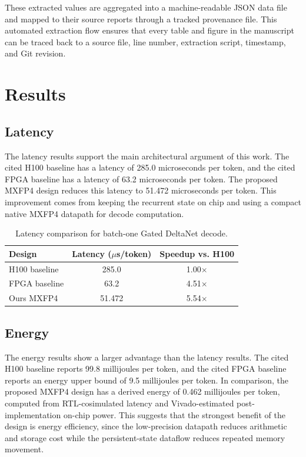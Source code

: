 \documentclass[conference]{IEEEtran}
\begin{document}
These extracted values are aggregated into a machine-readable JSON data file and mapped to their source reports through a tracked provenance file. This automated extraction flow ensures that every table and figure in the manuscript can be traced back to a source file, line number, extraction script, timestamp, and Git revision.

\section{Results}

\subsection{Latency}
The latency results support the main architectural argument of this work. The cited H100 baseline has a latency of 285.0 microseconds per token, and the cited FPGA baseline has a latency of 63.2 microseconds per token. The proposed MXFP4 design reduces this latency to 51.472 microseconds per token. This improvement comes from keeping the recurrent state on chip and using a compact native MXFP4 datapath for decode computation.


\begin{table}[t]
\centering
\caption{Latency comparison for batch-one Gated DeltaNet decode.}
\label{tab:latency_results}
\scriptsize
\setlength{\tabcolsep}{4pt}
\renewcommand{\arraystretch}{0.92}
\begin{tabular}{lcc}
\hline
Design & Latency ($\mu$s/token) & Speedup vs. H100 \\
\hline
H100 baseline & 285.0 & 1.00$\times$ \\
FPGA baseline & 63.2 & 4.51$\times$ \\
Ours MXFP4 & 51.472 & 5.54$\times$ \\
\hline
\end{tabular}
\end{table}

\subsection{Energy}
The energy results show a larger advantage than the latency results. The cited H100 baseline reports 99.8 millijoules per token, and the cited FPGA baseline reports an energy upper bound of 9.5 millijoules per token. In comparison, the proposed MXFP4 design has a derived energy of 0.462 millijoules per token, computed from RTL-cosimulated latency and Vivado-estimated post-implementation on-chip power. This suggests that the strongest benefit of the design is energy efficiency, since the low-precision datapath reduces arithmetic and storage cost while the persistent-state dataflow reduces repeated memory movement.
\end{document}
